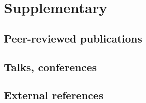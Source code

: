 \documentclass[10pt,a4paper]{moderncv}
\begin{document}
\newpage
\section{Supplementary}

\subsection{Peer-reviewed publications}
\printbibliography[keyword=peerReviewed,heading=none]

\subsection{Talks, conferences}
\nocite{*}
\printbibliography[keyword=talk,heading=none]

\subsection*{External references}
\printbibliography[heading=none,notkeyword=my]
\end{document}

